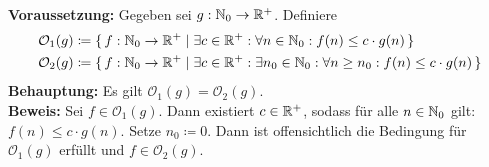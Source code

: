 \documentclass[a4paper,11pt]{article}             %
\begin{document}
\setcounter{excnt}{13}
\begin{ex}
  \leavevmode
  \begin{exlist}
  \item \label{ex:14a}  
   \textbf{Voraussetzung:} Gegeben sei $g:\mathbb{N}_0\to\mathbb{R}^+$. Definiere
     \begin{align*}
      \mathcal{O}_1(g) &\coloneqq \set{f:\mathbb{N}_0\to\mathbb{R}^+ | \exists c\in\mathbb{R}^+:\forall n\in\mathbb{N}_0:f(n)\leq c\cdot g(n)} \\
      \mathcal{O}_2(g) &\coloneqq \set{f:\mathbb{N}_0\to\mathbb{R}^+ | \exists c\in\mathbb{R}^+:\exists n_0\in\mathbb{N}_0:\forall n\geq n_0:f(n)\leq c\cdot g(n)} \\
     \end{align*}
  \textbf{Behauptung:} Es gilt $\mathcal{O}_1(g)=\mathcal{O}_2(g)$. \\
\textbf{Beweis:}
Sei $f\in\mathcal{O}_1(g)$. Dann existiert $c\in\mathbb{R}^+$, sodass für alle
$n\in\mathbb{N}_0$ gilt: $f(n)\leq c\cdot g(n)$. Setze $n_0\coloneqq 0$. Dann ist
offensichtlich die Bedingung für $\mathcal{O}_1(g)$ erfüllt und
$f\in\mathcal{O}_2(g)$.


\end{exlist}
\end{ex}
\end{document}
